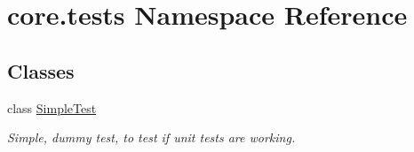 \hypertarget{namespacecore_1_1tests}{\section{core.\-tests Namespace Reference}
\label{namespacecore_1_1tests}
}
\subsection*{Classes}
\begin{DoxyCompactItemize}
\item 
class \hyperlink{classcore_1_1tests_1_1SimpleTest}{Simple\-Test}
\begin{DoxyCompactList}\small\item\em Simple, dummy test, to test if unit tests are working. \end{DoxyCompactList}\end{DoxyCompactItemize}
